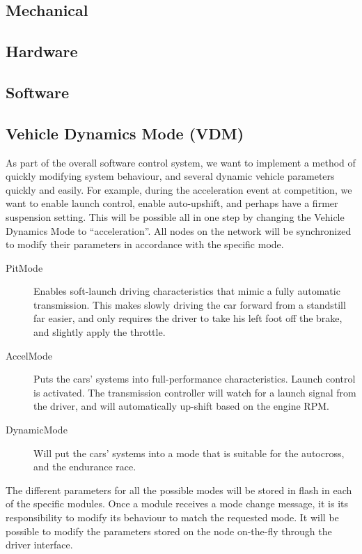 \subsection{Mechanical}
\subsection{Hardware}
\subsection{Software}

\subsection{Vehicle Dynamics Mode (VDM)}

As part of the overall software control system, we want to implement a method of quickly modifying system behaviour, and several dynamic vehicle parameters quickly and easily. For example, during the acceleration event at competition, we want to enable launch control, enable auto-upshift, and perhaps have a firmer suspension setting. This will be possible all in one step by changing the Vehicle Dynamics Mode to {}``acceleration''. All nodes on the network will be synchronized to modify their parameters in accordance with the specific mode.
\begin{description}
  \item [{PitMode}] Enables soft-launch driving characteristics that mimic a fully automatic transmission. This makes slowly driving the car forward from a standstill far easier, and only requires the driver to take his left foot off the brake, and slightly apply the throttle.
  \item [{AccelMode}] Puts the cars' systems into full-performance characteristics. Launch control is activated. The transmission controller will watch for a launch signal from the driver, and will automatically up-shift based on the engine RPM.
  \item [{DynamicMode}] Will put the cars' systems into a mode that is suitable for the autocross, and the endurance race.
\end{description}
The different parameters for all the possible modes will be stored in flash in each of the specific modules. Once a module receives a mode change message, it is its responsibility to modify its behaviour to match the requested mode. It will be possible to modify the parameters stored on the node on-the-fly through the driver interface.

